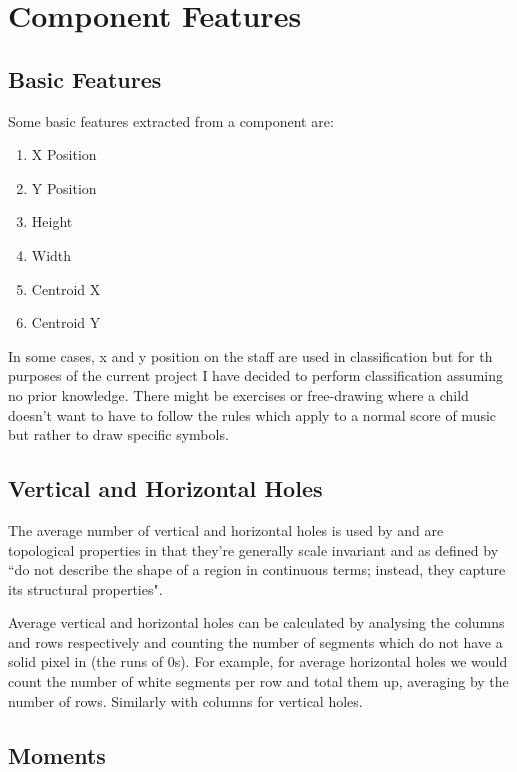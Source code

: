 \section{Component Features}
\label{sec:component-features}
\subsection{Basic Features}

Some basic features extracted from a component are:

\begin{enumerate}
  \item X Position
  \item Y Position
  \item Height
  \item Width
  \item Centroid X
  \item Centroid Y
\end{enumerate}


In some cases, x and y position on the staff are used in classification but for th purposes of the current project I have decided to perform classification assuming no prior knowledge. There might be exercises or free-drawing where a child doesn't want to have to follow the rules which apply to a normal score of music but rather to draw specific symbols.

\subsection{Vertical and Horizontal Holes}

The average number of vertical and horizontal holes is used by \cite{fujinaga1996adaptive} and are topological properties in that they're generally scale invariant and as defined by \cite{burger2009principles} ``do not describe the shape of a region in continuous terms; instead, they capture its structural properties".

Average vertical and horizontal holes can be calculated by analysing the columns and rows respectively and counting the number of segments which do not have a solid pixel in (the runs of 0s). For example, for average horizontal holes we would count the number of white segments per row and total them up, averaging by the number of rows. Similarly with columns for vertical holes.

\subsection{Moments}

